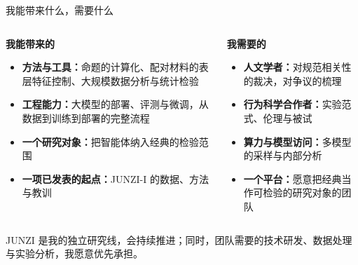 \documentclass[aspectratio=169,11pt,fontset=fandol]{ctexbeamer}
\newcommand{\hg}[1]{{\bfseries\color{golddeep}#1}}       %
\begin{document}
\begin{frame}[t]{我能带来什么，需要什么}
\begin{columns}[T,onlytextwidth]
\begin{thesis}
\hg{我能带来的}\par\vspace{2pt}
\small
\begin{itemize}\setlength{\itemsep}{3pt}
\item \textbf{方法与工具：}命题的计算化、配对材料的表层特征控制、大规模数据分析与统计检验
\item \textbf{工程能力：}大模型的部署、评测与微调，从数据到训练到部署的完整流程
\item \textbf{一个研究对象：}把智能体纳入经典的检验范围
\item \textbf{一项已发表的起点：}JUNZI-I 的数据、方法与教训
\end{itemize}
\end{thesis}
\begin{thesis}
\hg{我需要的}\par\vspace{2pt}
\small
\begin{itemize}\setlength{\itemsep}{3pt}
\item \textbf{人文学者：}对规范相关性的裁决，对争议的梳理
\item \textbf{行为科学合作者：}实验范式、伦理与被试
\item \textbf{算力与模型访问：}多模型的采样与内部分析
\item \textbf{一个平台：}愿意把经典当作可检验的研究对象的团队
\end{itemize}
\end{thesis}
\end{columns}
\vspace{5pt}
\begin{remark}
\small JUNZI 是我的独立研究线，会持续推进；同时，团队需要的技术研发、数据处理与实验分析，我愿意优先承担。
\end{remark}
\end{frame}
\end{document}
